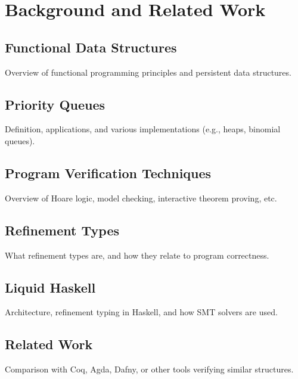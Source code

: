 \chapter { Background and Related Work }
\section { Functional Data Structures }
Overview of functional programming principles and persistent data structures.

\section { Priority Queues }
Definition, applications, and various implementations (e.g., heaps, binomial queues).

\section { Program Verification Techniques }
Overview of Hoare logic, model checking, interactive theorem proving, etc.

\section { Refinement Types }
What refinement types are, and how they relate to program correctness.

\section { Liquid Haskell }
Architecture, refinement typing in Haskell, and how SMT solvers are used.

\section { Related Work }
Comparison with Coq, Agda, Dafny, or other tools verifying similar structures.

